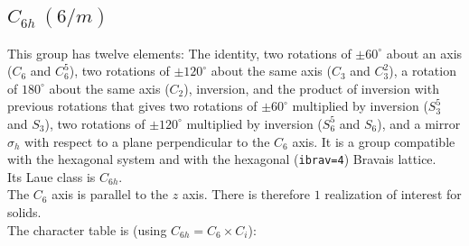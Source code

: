 \documentclass[12pt,a4paper]{article}
\begin{document}
\subsection{\color{web-blue}$C_{6h}\ (6/m)$}  
This group has twelve elements: The identity, two rotations of $\pm60^\circ$ 
about an axis ($C_6$ and $C_6^5$), two rotations of $\pm120^\circ$
about the same axis ($C_3$ and $C_3^2$), a rotation of $180^\circ$ about the
same axis ($C_2$), inversion, and the product of inversion with previous
rotations that gives two rotations of $\pm60^\circ$ multiplied by inversion
($S_3^5$ and $S_3$), two rotations of $\pm120^\circ$ multiplied 
by inversion ($S_6^5$ and $S_6$), and a mirror $\sigma_h$
with respect to a plane perpendicular to the $C_6$ axis. 
It is a group compatible with the hexagonal system and with the  
hexagonal (\texttt{ibrav=4}) Bravais lattice. \\ 
Its Laue class is $C_{6h}$. \\
The $C_6$ axis is parallel to the $z$ axis. There is therefore
$1$ realization of interest for solids. \\
The character table is (using $C_{6h}=C_6 \times C_i$):
\end{document}
